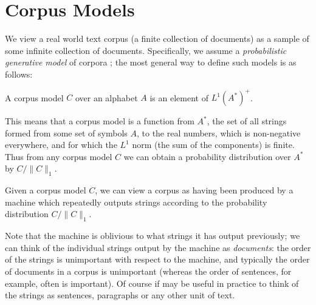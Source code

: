 \documentclass[11pt]{report}
\begin{document}
\section{Corpus Models}






 We view a real world text corpus (a finite collection of documents) as a sample of some infinite collection of documents. Specifically, we assume a \emph{probabilistic generative model} of corpora \citep{Blei:03}; the most general way to define such models is as follows:
\begin{defn}
A corpus model $C$ over an alphabet $A$ is an element of $L^1(A^*)^+$. 
\end{defn}\noindent
This means that a corpus model is a function from $A^*$, the set of all strings formed from some set of symbols $A$, to the real numbers, which is non-negative everywhere, and for which the $L^1$ norm (the sum of the components) is finite. Thus from any corpus model $C$ we can obtain a probability distribution over $A^*$ by $C/\|C\|_1$.

Given a corpus model $C$, we can view a corpus as having been produced by a machine which repeatedly outputs strings according to the probability distribution $C/\|C\|_1$.

Note that the machine is oblivious to what strings it has output previously; we can think of the individual strings output by the machine as \emph{documents}: the order of the strings is unimportant with respect to the machine, and typically the order of documents in a corpus is unimportant (whereas the order of sentences, for example, often is important). Of course if may be useful in practice to think of the strings as sentences, paragraphs or any other unit of text.
 
\end{document}
